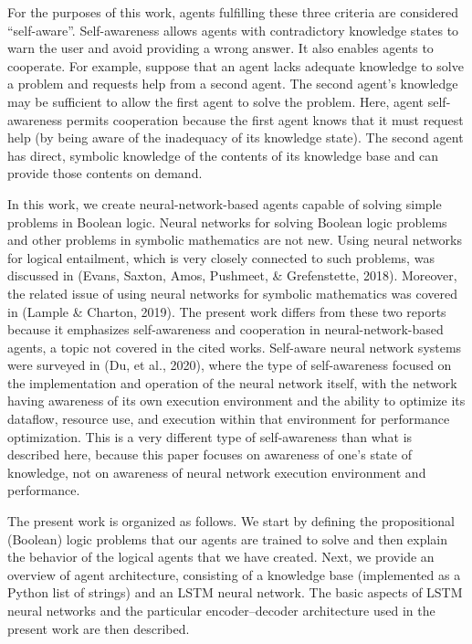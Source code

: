 \documentclass[
]{article}
\begin{document}
For the purposes of this work, agents fulfilling these three criteria
are considered ``self-aware''. Self-awareness allows agents with
contradictory knowledge states to warn the user and avoid providing a
wrong answer. It also enables agents to cooperate. For example, suppose
that an agent lacks adequate knowledge to solve a problem and requests
help from a second agent. The second agent's knowledge may be sufficient
to allow the first agent to solve the problem. Here, agent
self-awareness permits cooperation because the first agent knows that it
must request help (by being aware of the inadequacy of its knowledge
state). The second agent has direct, symbolic knowledge of the contents
of its knowledge base and can provide those contents on demand.

In this work, we create neural-network-based agents capable of solving
simple problems in Boolean logic. Neural networks for solving Boolean
logic problems and other problems in symbolic mathematics are not new.
Using neural networks for logical entailment, which is very closely
connected to such problems, was discussed in (Evans, Saxton, Amos,
Pushmeet, \& Grefenstette, 2018). Moreover, the related issue of using
neural networks for symbolic mathematics was covered in (Lample \&
Charton, 2019). The present work differs from these two reports because
it emphasizes self-awareness and cooperation in neural-network-based
agents, a topic not covered in the cited works. Self-aware neural
network systems were surveyed in (Du, et al., 2020), where the type of
self-awareness focused on the implementation and operation of the neural
network itself, with the network having awareness of its own execution
environment and the ability to optimize its dataflow, resource use, and
execution within that environment for performance optimization. This is
a very different type of self-awareness than what is described here,
because this paper focuses on awareness of one's state of knowledge, not
on awareness of neural network execution environment and performance.

The present work is organized as follows. We start by defining the
propositional (Boolean) logic problems that our agents are trained to
solve and then explain the behavior of the logical agents that we have
created. Next, we provide an overview of agent architecture, consisting
of a knowledge base (implemented as a Python list of strings) and an
LSTM neural network. The basic aspects of LSTM neural networks and the
particular encoder--decoder architecture used in the present work are
then described.
\end{document}

